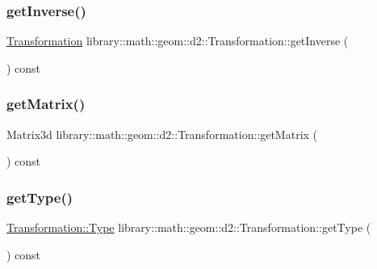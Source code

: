 \subsubsection{\texorpdfstring{get\+Inverse()}{getInverse()}}
{\footnotesize\ttfamily \hyperlink{classlibrary_1_1math_1_1geom_1_1d2_1_1_transformation}{Transformation} library\+::math\+::geom\+::d2\+::\+Transformation\+::get\+Inverse (\begin{DoxyParamCaption}{ }\end{DoxyParamCaption}) const}

\mbox{\label{classlibrary_1_1math_1_1geom_1_1d2_1_1_transformation_aad810cf9245ff4eea64b206cbce86e1b}} 
\subsubsection{\texorpdfstring{get\+Matrix()}{getMatrix()}}
{\footnotesize\ttfamily Matrix3d library\+::math\+::geom\+::d2\+::\+Transformation\+::get\+Matrix (\begin{DoxyParamCaption}{ }\end{DoxyParamCaption}) const}

\mbox{\label{classlibrary_1_1math_1_1geom_1_1d2_1_1_transformation_a295309ae952d473473540a5647a168c4}} 
\subsubsection{\texorpdfstring{get\+Type()}{getType()}}
{\footnotesize\ttfamily \hyperlink{classlibrary_1_1math_1_1geom_1_1d2_1_1_transformation_af2a94a7be48a51e9cc40f3075040d348}{Transformation\+::\+Type} library\+::math\+::geom\+::d2\+::\+Transformation\+::get\+Type (\begin{DoxyParamCaption}{ }\end{DoxyParamCaption}) const}

